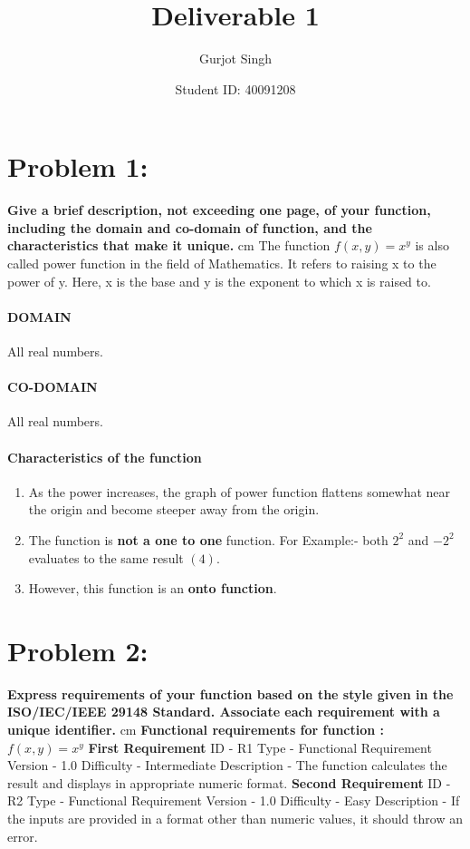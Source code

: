 \documentclass[12pt]{article}
\title{Deliverable 1}
\author{Gurjot Singh}
\date{Student ID: 40091208}
\begin{document}
\maketitle

\section*{Problem 1:}
\textbf{Give a brief description, not exceeding one page, of your function, including the domain
and co-domain of function, and the characteristics that make it unique. }
 cm
The function $f(x,y) = x^y$ is also called power function in the field of Mathematics. It refers to raising x to the power of y. Here, x is the base and y is the exponent to which x is raised to.\cite{r2}
\paragraph{DOMAIN\vskip 0.5cm}
    All real numbers.
\paragraph{CO-DOMAIN\vskip 0.5cm}
    All real numbers.
\paragraph{Characteristics of the function}
    
    
    \begin{enumerate}
\item As the power increases, the graph of power function flattens somewhat near the origin and become steeper away from the origin.
\item The function is \textbf{not a one to one} function. For Example:- both $2^2$ and $-2^2$ evaluates to the same result $(4)$.
\item However, this function is an \textbf{onto function}.
\end{enumerate}


\section*{Problem 2:}
\textbf{Express requirements of your function based on the style given in the ISO/IEC/IEEE
29148 Standard. Associate each requirement with a unique identifier.}
 cm
\textbf{Functional requirements for function : $f(x,y) = x^y$}
\vskip 1cm
\textbf{First Requirement}
\vskip 0.25cm
ID - R1
\vskip 0.25cm
Type - Functional Requirement
\vskip 0.25cm
Version - 1.0
\vskip 0.25cm
Difficulty - Intermediate
\vskip 0.25cm
Description - The function calculates the result and displays in appropriate numeric format.
\vskip 1cm
\textbf{Second Requirement}
\vskip 0.25cm
ID - R2
\vskip 0.25cm
Type - Functional Requirement
\vskip 0.25cm
Version - 1.0
\vskip 0.25cm
Difficulty - Easy
\vskip 0.25cm
Description - If the inputs are provided in a format other than numeric values, it should throw an error.
\vskip 1cm
\end{document}
